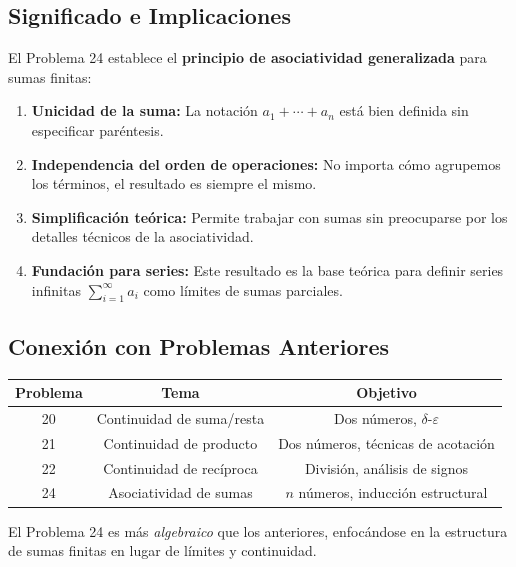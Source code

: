 \subsection*{Significado e Implicaciones}

El Problema 24 establece el \textbf{principio de asociatividad generalizada} para sumas finitas:

\begin{enumerate}
\item \textbf{Unicidad de la suma:} La notación $a_1 + \cdots + a_n$ está bien definida sin especificar paréntesis.

\item \textbf{Independencia del orden de operaciones:} No importa cómo agrupemos los términos, el resultado es siempre el mismo.

\item \textbf{Simplificación teórica:} Permite trabajar con sumas sin preocuparse por los detalles técnicos de la asociatividad.

\item \textbf{Fundación para series:} Este resultado es la base teórica para definir series infinitas $\sum_{i=1}^{\infty} a_i$ como límites de sumas parciales.
\end{enumerate}

\subsection*{Conexión con Problemas Anteriores}

\begin{center}
\begin{tabular}{|c|c|c|}
\hline
\textbf{Problema} & \textbf{Tema} & \textbf{Objetivo} \\
\hline
20 & Continuidad de suma/resta & Dos números, $\delta$-$\varepsilon$ \\
\hline
21 & Continuidad de producto & Dos números, técnicas de acotación \\
\hline
22 & Continuidad de recíproca & División, análisis de signos \\
\hline
24 & Asociatividad de sumas & $n$ números, inducción estructural \\
\hline
\end{tabular}
\end{center}

El Problema 24 es más \textit{algebraico} que los anteriores, enfocándose en la estructura de sumas finitas en lugar de límites y continuidad.

